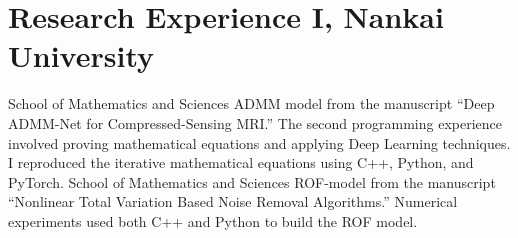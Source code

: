 \documentclass[11pt,a4paper, final]{moderncv}
\newcommand{\spacesection}{\vspace{0.4cm}}
\begin{document}
\section{\textbf{Research Experience I}, Nankai University}
	{}{}{School of Mathematics and Sciences}
	{ADMM model from the manuscript “Deep ADMM-Net for Compressed-Sensing MRI.”}
	{The second programming experience involved proving mathematical equations and applying Deep Learning techniques. 
	I reproduced the iterative mathematical equations using C++, Python, and PyTorch.}
	{}{}{School of Mathematics and Sciences}
	{ROF-model from the manuscript “Nonlinear Total Variation Based Noise Removal Algorithms.”}
	{Numerical experiments used both C++ and Python to build the ROF model.}
\end{document}
